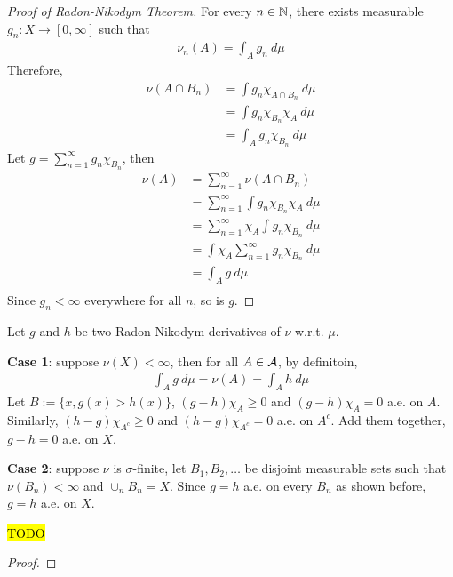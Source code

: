 \documentclass[11pt]{article}
\newcommand{\dmu}[0]{\ d\mu}
\begin{document}
\begin{proof}[Proof of Radon-Nikodym Theorem]
		For every $n \in \mathbb{N}$, there exists measurable $g_n: X \to [0,\infty]$ such that
		\begin{align}
			\nu_n(A) = \int_A g_n\dmu
		\end{align}
		Therefore,
		\begin{align}
			 \nu(A \cap B_n) &= \int g_n \chi_{A \cap B_n}\dmu \\
			 &= \int g_n \chi_{B_n} \chi_A\dmu \\
			 &= \int_A g_n \chi_{B_n}\dmu
		\end{align}
		Let $g = \sum_{n=1}^\infty g_n \chi_{B_n}$, then
		\begin{align}
			\nu(A) &= \sum_{n=1}^\infty \nu(A \cap B_n) \\
			&=\sum_{n=1}^\infty \int g_n \chi_{B_n} \chi_A\dmu \\
			&=\sum_{n=1}^\infty \chi_A \int g_n \chi_{B_n} \dmu \\
			&=\int \chi_A \sum_{n=1}^\infty g_n \chi_{B_n} \dmu \\
			&=\int_A g \dmu \\
		\end{align}
		Since $g_n < \infty$ everywhere for all $n$, so is $g$.
	\end{proof}
	
	\begin{remark}
		Let $g$ and $h$ be two Radon-Nikodym derivatives of $\nu$ w.r.t. $\mu$.

		\textbf{Case 1}: suppose $\nu(X) < \infty$, then for all $A \in \mathcal{{A}}$, by definitoin,
		\begin{align}
			\int_A g\dmu = \nu(A) = \int_A h\dmu
		\end{align}
		Let $B := \{x, g(x) > h(x)\}$, $(g-h) \chi_A \geq 0$ and $(g-h) \chi_A = 0$ a.e. on $A$.
		Similarly, $(h-g) \chi_{A^c} \geq 0$ and $(h-g)\chi_{A^c} = 0$ a.e. on $A^c$.
		Add them together, $g - h = 0$ a.e. on $X$.
		
		\textbf{Case 2}: suppose $\nu$ is $\sigma$-finite, let $B_1, B_2, \dots$ be disjoint measurable sets such that $\nu(B_n) < \infty$ and $\cup_n B_n = X$.
		Since $g = h$ a.e. on every $B_n$ as shown before, $g = h$ a.e. on $X$.
	\end{remark}
	
	\begin{theorem}
		\hl{TODO}
		\begin{proof}
			
		\end{proof}
	\end{theorem}
	
\end{document}
